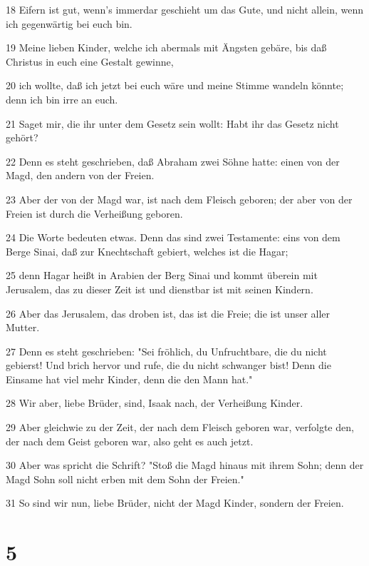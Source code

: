 \par 18 Eifern ist gut, wenn's immerdar geschieht um das Gute, und nicht allein, wenn ich gegenwärtig bei euch bin.
\par 19 Meine lieben Kinder, welche ich abermals mit Ängsten gebäre, bis daß Christus in euch eine Gestalt gewinne,
\par 20 ich wollte, daß ich jetzt bei euch wäre und meine Stimme wandeln könnte; denn ich bin irre an euch.
\par 21 Saget mir, die ihr unter dem Gesetz sein wollt: Habt ihr das Gesetz nicht gehört?
\par 22 Denn es steht geschrieben, daß Abraham zwei Söhne hatte: einen von der Magd, den andern von der Freien.
\par 23 Aber der von der Magd war, ist nach dem Fleisch geboren; der aber von der Freien ist durch die Verheißung geboren.
\par 24 Die Worte bedeuten etwas. Denn das sind zwei Testamente: eins von dem Berge Sinai, daß zur Knechtschaft gebiert, welches ist die Hagar;
\par 25 denn Hagar heißt in Arabien der Berg Sinai und kommt überein mit Jerusalem, das zu dieser Zeit ist und dienstbar ist mit seinen Kindern.
\par 26 Aber das Jerusalem, das droben ist, das ist die Freie; die ist unser aller Mutter.
\par 27 Denn es steht geschrieben: "Sei fröhlich, du Unfruchtbare, die du nicht gebierst! Und brich hervor und rufe, die du nicht schwanger bist! Denn die Einsame hat viel mehr Kinder, denn die den Mann hat."
\par 28 Wir aber, liebe Brüder, sind, Isaak nach, der Verheißung Kinder.
\par 29 Aber gleichwie zu der Zeit, der nach dem Fleisch geboren war, verfolgte den, der nach dem Geist geboren war, also geht es auch jetzt.
\par 30 Aber was spricht die Schrift? "Stoß die Magd hinaus mit ihrem Sohn; denn der Magd Sohn soll nicht erben mit dem Sohn der Freien."
\par 31 So sind wir nun, liebe Brüder, nicht der Magd Kinder, sondern der Freien.

\chapter{5}

